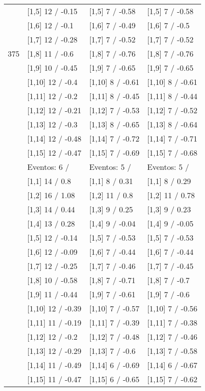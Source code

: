 \begin{table}
\begin{tabular}[t]{llll}
 & {}[1,5] 12  / -0.15 & {}[1,5] 7  / -0.58 & {}[1,5] 7  / -0.58\\
 & {}[1,6] 12  / -0.1 & {}[1,6] 7  / -0.49 & {}[1,6] 7  / -0.5\\
 & {}[1,7] 12  / -0.28 & {}[1,7] 7  / -0.52 & {}[1,7] 7  / -0.52\\
375 & {}[1,8] 11  / -0.6 & {}[1,8] 7  / -0.76 & {}[1,8] 7  / -0.76\\
\addlinespace
 & {}[1,9] 10  / -0.45 & {}[1,9] 7  / -0.65 & {}[1,9] 7  / -0.65\\
 & {}[1,10] 12  / -0.4 & {}[1,10] 8  / -0.61 & {}[1,10] 8  / -0.61\\
 & {}[1,11] 12  / -0.2 & {}[1,11] 8  / -0.45 & {}[1,11] 8  / -0.44\\
 & {}[1,12] 12  / -0.21 & {}[1,12] 7  / -0.53 & {}[1,12] 7  / -0.52\\
 & {}[1,13] 12  / -0.3 & {}[1,13] 8  / -0.65 & {}[1,13] 8  / -0.64\\
\addlinespace
 & {}[1,14] 12  / -0.48 & {}[1,14] 7  / -0.72 & {}[1,14] 7  / -0.71\\
 & {}[1,15] 12  / -0.47 & {}[1,15] 7  / -0.69 & {}[1,15] 7  / -0.68\\
 & Eventos:  6 / & Eventos:  5 / & Eventos:  5 /\\
 & {}[1,1] 14  / 0.8 & {}[1,1] 8  / 0.31 & {}[1,1] 8  / 0.29\\
 & {}[1,2] 16  / 1.08 & {}[1,2] 11  / 0.8 & {}[1,2] 11  / 0.78\\
\addlinespace
 & {}[1,3] 14  / 0.44 & {}[1,3] 9  / 0.25 & {}[1,3] 9  / 0.23\\
 & {}[1,4] 13  / 0.28 & {}[1,4] 9  / -0.04 & {}[1,4] 9  / -0.05\\
 & {}[1,5] 12  / -0.14 & {}[1,5] 7  / -0.53 & {}[1,5] 7  / -0.53\\
 & {}[1,6] 12  / -0.09 & {}[1,6] 7  / -0.44 & {}[1,6] 7  / -0.44\\
 & {}[1,7] 12  / -0.25 & {}[1,7] 7  / -0.46 & {}[1,7] 7  / -0.45\\
\addlinespace
500 & {}[1,8] 10  / -0.58 & {}[1,8] 7  / -0.71 & {}[1,8] 7  / -0.7\\
 & {}[1,9] 11  / -0.44 & {}[1,9] 7  / -0.61 & {}[1,9] 7  / -0.6\\
 & {}[1,10] 12  / -0.39 & {}[1,10] 7  / -0.57 & {}[1,10] 7  / -0.56\\
 & {}[1,11] 11  / -0.19 & {}[1,11] 7  / -0.39 & {}[1,11] 7  / -0.38\\
 & {}[1,12] 12  / -0.2 & {}[1,12] 7  / -0.48 & {}[1,12] 7  / -0.46\\
\addlinespace
 & {}[1,13] 12  / -0.29 & {}[1,13] 7  / -0.6 & {}[1,13] 7  / -0.58\\
 & {}[1,14] 11  / -0.49 & {}[1,14] 6  / -0.69 & {}[1,14] 6  / -0.67\\
 & {}[1,15] 11  / -0.47 & {}[1,15] 6  / -0.65 & {}[1,15] 7  / -0.62\\
\bottomrule
\end{tabular}
\end{table}
